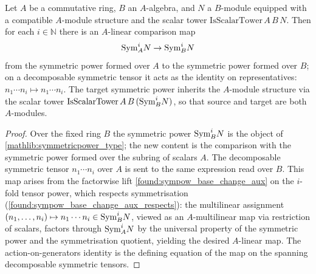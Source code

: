 \begin{lemma}
  \label{found:sympow_base_change_linear}
  Let \(A\) be a commutative ring, \(B\) an \(A\)-algebra, and \(N\) a
  \(B\)-module equipped with a compatible \(A\)-module structure and the scalar
  tower \(\mathrm{IsScalarTower}\,A\,B\,N\).  Then for each \(i\in\mathbb N\)
  there is an \(A\)-linear comparison map
  \[
    \mathrm{Sym}^i_A N\to\mathrm{Sym}^i_B N
  \]
  from the symmetric power formed over \(A\) to the symmetric power formed over
  \(B\); on a decomposable symmetric tensor it acts as the identity on
  representatives: \(n_1\cdots n_i\mapsto n_1\cdots n_i\).  The target symmetric
  power inherits the \(A\)-module structure via the scalar tower
  \(\mathrm{IsScalarTower}\,A\,B\,(\mathrm{Sym}^i_B N)\), so that source and target are
  both \(A\)-modules.
\end{lemma}

\begin{proof}
  \leanok
  Over the fixed ring \(B\) the symmetric power \(\mathrm{Sym}^i_B N\) is the object of
  \cref{mathlib:symmetricpower_type}; the new content is the comparison with the
  symmetric power formed over the subring of scalars \(A\).  The decomposable
  symmetric tensor \(n_1\cdots n_i\) over \(A\) is sent to the same expression
  read over \(B\).  This map arises from the factorwise lift
  \cref{found:sympow_base_change_aux} on the \(i\)-fold tensor power, which respects
  symmetrisation (\cref{found:sympow_base_change_aux_respects}): the multilinear assignment
  \((n_1,\dots,n_i)\mapsto n_1\cdots n_i\in\mathrm{Sym}^i_B N\), viewed as an
  \(A\)-multilinear map via restriction of scalars, factors through \(\mathrm{Sym}^i_A N\)
  by the universal property of the symmetric power and the symmetrisation quotient,
  yielding the desired \(A\)-linear map.  The action-on-generators identity is the
  defining equation of the map on the spanning decomposable symmetric tensors.
\end{proof}

